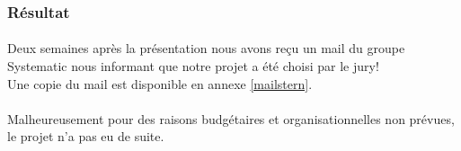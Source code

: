 \subsubsection{Résultat}
\paragraph*{}
Deux semaines après la présentation nous avons reçu un mail du groupe Systematic nous informant que notre projet a été choisi par le jury!\\
Une copie du mail est disponible en annexe \ref{mailstern}.

\paragraph*{}
Malheureusement pour des raisons budgétaires et organisationnelles non prévues, le projet n'a pas eu de suite.
%
%



\cite{test}
